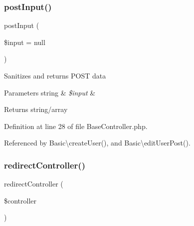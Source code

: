 \subsubsection{\texorpdfstring{post\+Input()}{postInput()}}
{\footnotesize\ttfamily post\+Input (\begin{DoxyParamCaption}\item[{}]{\$input = {\ttfamily null} }\end{DoxyParamCaption})\hspace{0.3cm}{\ttfamily [protected]}}

Sanitizes and returns P\+O\+ST data


\begin{DoxyParams}[1]{Parameters}
string & {\em \$input} & \\
\hline
\end{DoxyParams}
\begin{DoxyReturn}{Returns}
string/array 
\end{DoxyReturn}


Definition at line 28 of file Base\+Controller.\+php.



Referenced by Basic\textbackslash{}create\+User(), and Basic\textbackslash{}edit\+User\+Post().


\hypertarget{class_base_controller_a85ddb683efc64655be063b697f631beb}{}\label{class_base_controller_a85ddb683efc64655be063b697f631beb} 
\subsubsection{\texorpdfstring{redirect\+Controller()}{redirectController()}}
{\footnotesize\ttfamily redirect\+Controller (\begin{DoxyParamCaption}\item[{}]{\$controller }\end{DoxyParamCaption})\hspace{0.3cm}{\ttfamily [protected]}}

